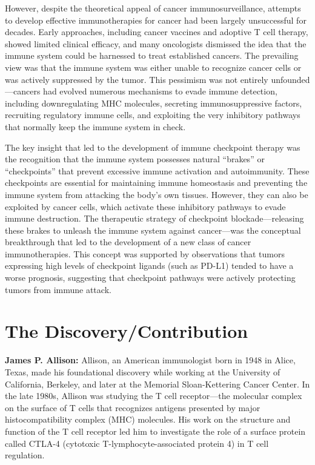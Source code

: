 However, despite the theoretical appeal of cancer immunosurveillance, attempts to develop effective immunotherapies for cancer had been largely unsuccessful for decades. Early approaches, including cancer vaccines and adoptive T cell therapy, showed limited clinical efficacy, and many oncologists dismissed the idea that the immune system could be harnessed to treat established cancers. The prevailing view was that the immune system was either unable to recognize cancer cells or was actively suppressed by the tumor. This pessimism was not entirely unfounded---cancers had evolved numerous mechanisms to evade immune detection, including downregulating MHC molecules, secreting immunosuppressive factors, recruiting regulatory immune cells, and exploiting the very inhibitory pathways that normally keep the immune system in check.

The key insight that led to the development of immune checkpoint therapy was the recognition that the immune system possesses natural ``brakes'' or ``checkpoints'' that prevent excessive immune activation and autoimmunity. These checkpoints are essential for maintaining immune homeostasis and preventing the immune system from attacking the body's own tissues. However, they can also be exploited by cancer cells, which activate these inhibitory pathways to evade immune destruction. The therapeutic strategy of checkpoint blockade---releasing these brakes to unleash the immune system against cancer---was the conceptual breakthrough that led to the development of a new class of cancer immunotherapies. This concept was supported by observations that tumors expressing high levels of checkpoint ligands (such as PD-L1) tended to have a worse prognosis, suggesting that checkpoint pathways were actively protecting tumors from immune attack.

\section{The Discovery/Contribution}

\textbf{James P. Allison:} Allison, an American immunologist born in 1948 in Alice, Texas, made his foundational discovery while working at the University of California, Berkeley, and later at the Memorial Sloan-Kettering Cancer Center. In the late 1980s, Allison was studying the T cell receptor---the molecular complex on the surface of T cells that recognizes antigens presented by major histocompatibility complex (MHC) molecules. His work on the structure and function of the T cell receptor led him to investigate the role of a surface protein called CTLA-4 (cytotoxic T-lymphocyte-associated protein 4) in T cell regulation.

